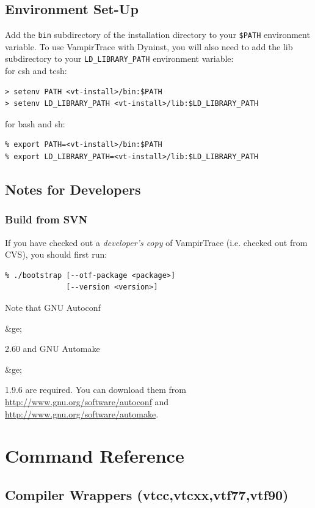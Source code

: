 \documentclass[a4paper,twoside,12pt,BCOR12mm]{scrbook}
\newcommand{\greq}{$\ge$}  %
\renewcommand{\greq}{\begin{rawhtml}&ge;\end{rawhtml}}   %
\begin{document}
\begin{latexonly}
\section{Environment Set-Up}


    Add the \texttt{bin} subdirectory of the installation directory to your 
    \texttt{\$PATH} environment variable. To use VampirTrace with Dyninst, 
    you will also need to add the lib subdirectory to your 
    \texttt{LD\_LIBRARY\_PATH} environment variable:\\[2ex]
    for csh and tcsh:
\begin{verbatim}
> setenv PATH <vt-install>/bin:$PATH
> setenv LD_LIBRARY_PATH <vt-install>/lib:$LD_LIBRARY_PATH
\end{verbatim} 
    for bash and sh:
\begin{verbatim}
% export PATH=<vt-install>/bin:$PATH
% export LD_LIBRARY_PATH=<vt-install>/lib:$LD_LIBRARY_PATH
\end{verbatim} 

\section{Notes for Developers}

\subsection*{Build from SVN}

      If you have checked out a \textit{developer's copy} of VampirTrace (i.e.
      checked out from CVS), you should first run:

\begin{verbatim}
% ./bootstrap [--otf-package <package>]
              [--version <version>]
\end{verbatim}
Note that GNU Autoconf \greq 2.60 and GNU Automake \greq 1.9.6 are required.
You can download them from \url{http://www.gnu.org/software/autoconf} 
and \url{http://www.gnu.org/software/automake}.



\chapter{Command Reference}
\section{Compiler Wrappers (vtcc,vtcxx,vtf77,vtf90)}
\label{sec:comm_wrappers}


\end{latexonly}
\end{document}
